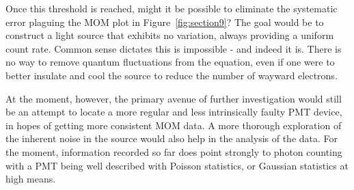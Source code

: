 \documentclass[a4paper,12pt]{article}
\begin{document}
Once this threshold is reached, might it be possible to eliminate the systematic error plaguing the MOM plot in Figure~\ref{fig:section9}? The goal would be to construct a light source that exhibits no variation, always providing a uniform count rate. Common sense dictates this is impossible - and indeed it is. There is no way to remove quantum fluctuations from the equation, even if one were to better insulate and cool the source to reduce the number of wayward electrons.

At the moment, however, the primary avenue of further investigation would still be an attempt to locate a more regular and less intrinsically faulty PMT device, in hopes of getting more consistent MOM data. A more thorough exploration of the inherent noise in the source would also help in the analysis of the data. For the moment, information recorded so far does point strongly to photon counting with a PMT being well described with Poisson statistics, or Gaussian statistics at high means.






\end{document}
